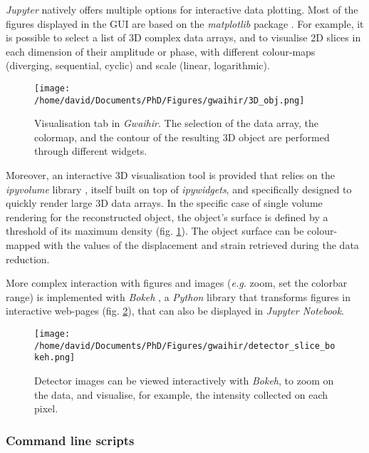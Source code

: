 \textit{Jupyter} natively offers multiple options for interactive data plotting.
Most of the figures displayed in the GUI are based on the \textit{matplotlib} package \parencite{Hunter2007}.
For example, it is possible to select a list of 3D complex data arrays, and to visualise 2D slices in each dimension of their amplitude or phase, with different colour-maps (diverging, sequential, cyclic) and scale (linear, logarithmic).

\begin{figure}[!htb]
    \centering
    \texttt{[image: /home/david/Documents/PhD/Figures/gwaihir/3D\_obj.png]}
    \caption{
    Visualisation tab in \textit{Gwaihir}.
    The selection of the data array, the colormap, and the contour of the resulting 3D object are performed through different widgets.
    }
    \label{fig:3D_object}
\end{figure}

Moreover, an interactive 3D visualisation tool is provided that relies on the \textit{ipyvolume} library \parencite{Breddeld2021}, itself built on top of \textit{ipywidgets}, and specifically designed to quickly render large 3D data arrays.
In the specific case of single volume rendering for the reconstructed object, the object's surface is defined by a threshold of its maximum density (fig. \ref{fig:3D_object}).
The object surface can be colour-mapped with the values of the displacement and strain retrieved during the data reduction.

More complex interaction with figures and images (\textit{e.g.} zoom, set the colorbar range) is implemented with \textit{Bokeh} \parencite{Bokeh}, a \textit{Python} library that transforms figures in interactive web-pages (fig. \ref{fig:BokehDetector}), that can also be displayed in \textit{Jupyter Notebook}.

\begin{figure}[!htb]
    \centering
    \texttt{[image: /home/david/Documents/PhD/Figures/gwaihir/detector\_slice\_bokeh.png]}
    \caption{
    Detector images can be viewed interactively with \textit{Bokeh}, to zoom on the data, and visualise, for example, the intensity collected on each pixel.
    }
    \label{fig:BokehDetector}
\end{figure}

\subsubsection{Command line scripts}


